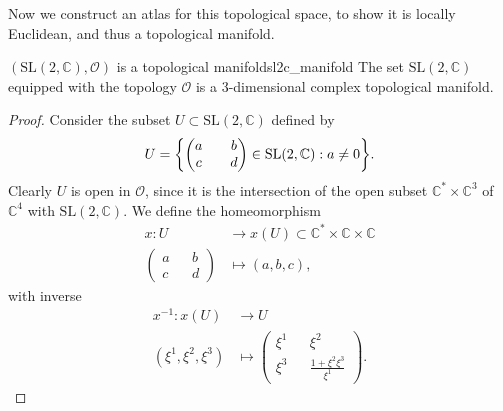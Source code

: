 Now we construct an atlas for this topological space, to show it is locally Euclidean, and thus a topological manifold.
\begin{proposition}{\((\mathrm{SL}(2,\mathbb{C}), \mathcal{O})\) is a topological manifold}{sl2c_manifold}
    The set \(\mathrm{SL}(2,\mathbb{C})\) equipped with the topology \(\mathcal{O}\) is a 3-dimensional complex topological manifold.
\end{proposition}
\begin{proof}
    Consider the subset \(U \subset \mathrm{SL}(2, \mathbb{C})\) defined by
    \begin{equation*}
        U = \set*{\begin{pmatrix}
                a && b\\c&&d
        \end{pmatrix} \in \mathrm{SL}(2, \mathbb{C}) : a \neq 0}.
    \end{equation*}
    Clearly \(U\) is open in \(\mathcal{O}\), since it is the intersection of the open subset \(\mathbb{C}^{\ast} \times \mathbb{C}^3\) of \(\mathbb{C}^4\) with \(\mathrm{SL}(2, \mathbb{C}).\) We define the homeomorphism
    \begin{align*}
        x : U &\to x(U) \subset \mathbb{C}^{\ast}\times \mathbb{C} \times \mathbb{C}\\
            \begin{pmatrix}
                a && b\\c&&d
            \end{pmatrix}  &\mapsto (a,b,c),
    \end{align*}
    with inverse
    \begin{align*}
        x^{-1} : x(U) &\to U\\
              (\xi^1,\xi^2,\xi^3) &\mapsto \begin{pmatrix}
                          \xi^1 && \xi^2\\\xi^3&& \frac{1 + \xi^2\xi^3}{\xi^1}
                      \end{pmatrix}.
    \end{align*}


\end{proof}
